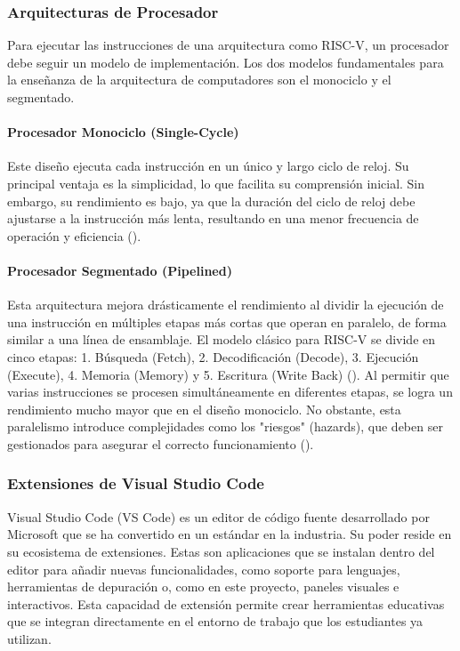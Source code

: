 \documentclass[12pt, letterpaper]{article}
\begin{document}
\subsubsection{Arquitecturas de Procesador}
Para ejecutar las instrucciones de una arquitectura como RISC-V, un procesador debe seguir un modelo de implementación. Los dos modelos fundamentales para la enseñanza de la arquitectura de computadores son el monociclo y el segmentado.

\paragraph{Procesador Monociclo (Single-Cycle)}
Este diseño ejecuta cada instrucción en un único y largo ciclo de reloj. Su principal ventaja es la simplicidad, lo que facilita su comprensión inicial. Sin embargo, su rendimiento es bajo, ya que la duración del ciclo de reloj debe ajustarse a la instrucción más lenta, resultando en una menor frecuencia de operación y eficiencia (\cite{ihtemam2024}).

\paragraph{Procesador Segmentado (Pipelined)}
Esta arquitectura mejora drásticamente el rendimiento al dividir la ejecución de una instrucción en múltiples etapas más cortas que operan en paralelo, de forma similar a una línea de ensamblaje. El modelo clásico para RISC-V se divide en cinco etapas: 1. Búsqueda (Fetch), 2. Decodificación (Decode), 3. Ejecución (Execute), 4. Memoria (Memory) y 5. Escritura (Write Back) (\cite{khairullah2022}). Al permitir que varias instrucciones se procesen simultáneamente en diferentes etapas, se logra un rendimiento mucho mayor que en el diseño monociclo. No obstante, esta paralelismo introduce complejidades como los "riesgos" (hazards), que deben ser gestionados para asegurar el correcto funcionamiento (\cite{ihtemam2024}).

\subsubsection{Extensiones de Visual Studio Code}
Visual Studio Code (VS Code) es un editor de código fuente desarrollado por Microsoft que se ha convertido en un estándar en la industria. Su poder reside en su ecosistema de extensiones. Estas son aplicaciones que se instalan dentro del editor para añadir nuevas funcionalidades, como soporte para lenguajes, herramientas de depuración o, como en este proyecto, paneles visuales e interactivos. Esta capacidad de extensión permite crear herramientas educativas que se integran directamente en el entorno de trabajo que los estudiantes ya utilizan.
\end{document}
